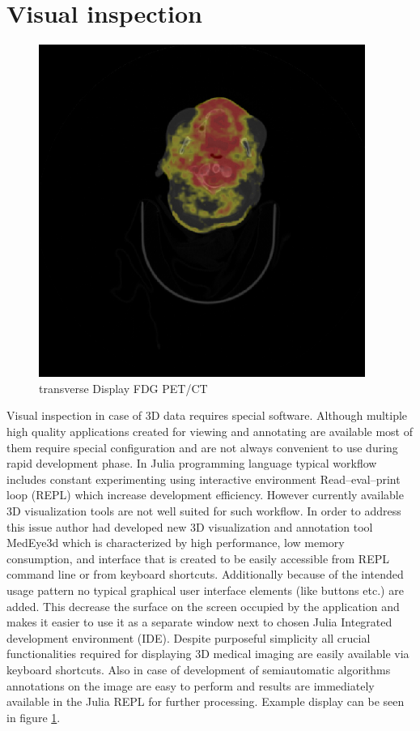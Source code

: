 \documentclass[preprint,12pt]{elsarticle}
\begin{document}
\section{Visual inspection}

\begin{figure}[t!]
	\centering
	\includegraphics[width=0.95\textwidth]{PETCTCORONAL.png}
	\caption{transverse Display FDG PET/CT}
	\label{fig:PETCTCORONAL}
	\centering
\end{figure}

Visual inspection in case of 3D data requires special software. Although multiple high quality applications created for viewing and annotating are available most of them require special configuration and are not always convenient to use during rapid development phase. In Julia programming language typical workflow includes constant experimenting using interactive environment Read–eval–print loop (REPL) which increase development efficiency. However currently available 3D visualization tools are not well suited for such workflow. In order to address this issue author had developed new  3D visualization and annotation tool MedEye3d \cite{Mitura2021} which is characterized by high performance, low memory consumption, and interface that is created to be easily accessible from REPL command line or from keyboard shortcuts. Additionally because of the intended usage pattern no typical graphical user interface elements (like buttons etc.) are added. This decrease the surface on the screen occupied by the application and makes it easier to use it as a separate window next to chosen Julia Integrated development environment (IDE). Despite purposeful simplicity all crucial functionalities required for displaying 3D medical imaging are easily available via keyboard shortcuts. Also in case of development of semiautomatic algorithms annotations on the image are easy to perform and results are immediately available in the Julia REPL for further processing. Example display can be seen in figure \ref{fig:PETCTCORONAL}.
\end{document}
